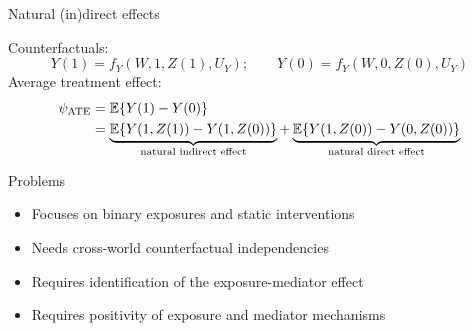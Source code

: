 \documentclass{beamer}
\begin{document}

\begin{frame}{Natural (in)direct effects}

Counterfactuals:
  \[Y(1) = f_Y(W, 1, Z(1), U_Y);\quad\quad Y(0) = f_Y(W, 0, Z(0),
    U_Y)\]
Average treatment effect:
  \begin{align*}
   \psi_{\text{ATE}} &= \mathbb{E}\{Y(1) - Y(0)\}\\
                 &=\underbrace{\mathbb{E}\{Y(1, Z(1)) -
                   Y(1, Z(0))\}}_{\text{natural indirect effect}} +
                   \underbrace{\mathbb{E}\{Y(1, Z(0)) -
                   Y(0, Z(0))\}}_{\text{natural direct effect}}
  \end{align*}
  \begin{block}{Problems}
    \begin{itemize}
      \item Focuses on binary exposures and static interventions
      \item Needs cross-world counterfactual independencies
      \item Requires identification of the exposure-mediator effect
      \item Requires positivity of exposure and mediator mechanisms
    \end{itemize}
  \end{block}


\end{frame}

\end{document}
